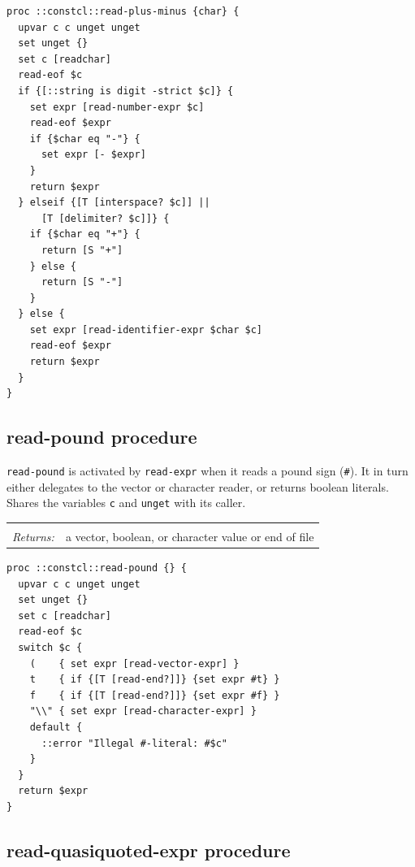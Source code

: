 \documentclass[twoside]{report}
\begin{document}
\begin{lstlisting}
proc ::constcl::read-plus-minus {char} {
  upvar c c unget unget
  set unget {}
  set c [readchar]
  read-eof $c
  if {[::string is digit -strict $c]} {
    set expr [read-number-expr $c]
    read-eof $expr
    if {$char eq "-"} {
      set expr [- $expr]
    }
    return $expr
  } elseif {[T [interspace? $c]] ||
      [T [delimiter? $c]]} {
    if {$char eq "+"} {
      return [S "+"]
    } else {
      return [S "-"]
    }
  } else {
    set expr [read-identifier-expr $char $c]
    read-eof $expr
    return $expr
  }
}
\end{lstlisting}

\subsection{read-pound procedure}
\label{readpound-procedure}

\texttt{read-pound} is activated by \texttt{read-expr} when it reads a pound sign (\texttt{\#}). It in turn either delegates to the vector or character reader, or returns boolean literals. Shares the variables \texttt{c} and \texttt{unget} with its caller.

\noindent\begin{tabular}{ |p{1.9cm} p{8cm}| }
\hline
\rowcolor[HTML]{CCCCCC} \multicolumn{2}{|l|}{\bf read-pound (internal)} \\
\textit{Returns:} & a vector, boolean, or character value or end of file \\
\hline
\end{tabular}

\begin{lstlisting}
proc ::constcl::read-pound {} {
  upvar c c unget unget
  set unget {}
  set c [readchar]
  read-eof $c
  switch $c {
    (    { set expr [read-vector-expr] }
    t    { if {[T [read-end?]]} {set expr #t} }
    f    { if {[T [read-end?]]} {set expr #f} }
    "\\" { set expr [read-character-expr] }
    default {
      ::error "Illegal #-literal: #$c"
    }
  }
  return $expr
}
\end{lstlisting}

\subsection{read-quasiquoted-expr procedure}
\label{readquasiquotedexpr-procedure}
\end{document}
